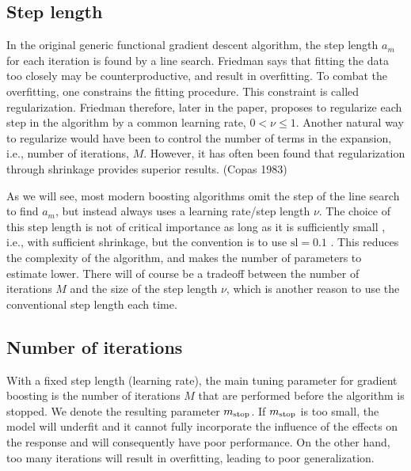 \subsection{Step length}
In the original generic functional gradient descent algorithm, the step length $a_m$ for each iteration is found by a line search.
Friedman says that fitting the data too closely may be counterproductive, and result in overfitting. To combat the overfitting, one constrains the fitting procedure. This constraint is called regularization. Friedman therefore, later in the paper, proposes to regularize each step in the algorithm by a common learning rate, $0<\nu\leq1$. Another natural way to regularize would have been to control the number of terms in the expansion, i.e., number of iterations, $M$. However, it has often been found that regularization through shrinkage provides superior results. (Copas 1983) 

As we will see, most modern boosting algorithms omit the step of the line search to find $a_m$, but instead always uses a learning rate/step length $\nu$.  
The choice of this step length is not of critical importance as long as it is sufficiently small \citep{schmid-hothorn}, i.e., with sufficient shrinkage, but the convention is to use $\text{sl}=0.1$ \citep{mayr14a}. This reduces the complexity of the algorithm, and makes the number of parameters to estimate lower. There will of course be a tradeoff between the number of iterations $M$ and the size of the step length $\nu$, which is another reason to use the conventional step length each time.

\subsection{Number of iterations}
With a fixed step length (learning rate), the main tuning parameter for gradient boosting is the number of iterations $M$ that are performed before the algorithm is stopped. We denote the resulting parameter $m_{\text{stop}}$. If $m_{\text{stop}}$ is too small, the model will underfit and it cannot fully incorporate the influence of the effects on the response and will consequently have poor performance. On the other hand, too many iterations will result in overfitting, leading to poor generalization.

